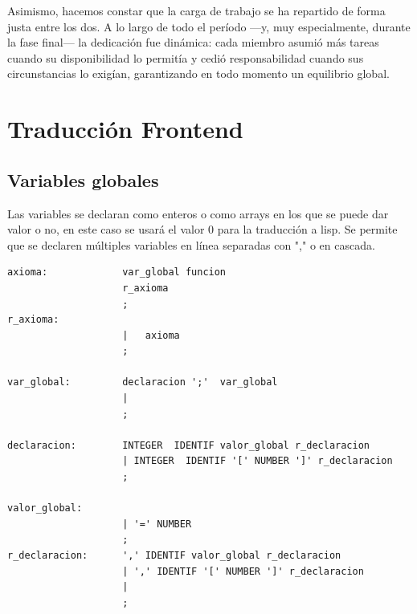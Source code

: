 \documentclass[12pt,a4paper]{article}
\begin{document}
\smallskip
\noindent Asimismo, hacemos constar que la carga de trabajo se ha repartido de forma justa entre los dos. 
A lo largo de todo el período —y, muy especialmente, durante la fase final— la dedicación fue dinámica: 
cada miembro asumió más tareas cuando su disponibilidad lo permitía y cedió responsabilidad cuando sus 
circunstancias lo exigían, garantizando en todo momento un equilibrio global.

\section{Traducción Frontend}
\subsection{Variables globales}
\noindent Las variables se declaran como enteros o como arrays en los que se puede dar valor o no, en este caso se 
usará el valor 0 para la traducción a lisp. Se permite que se declaren múltiples variables en línea 
separadas con "," o en cascada.
\begin{lstlisting}
axioma:             var_global funcion
                    r_axioma
                    ;
r_axioma:
                    |   axioma
                    ;

var_global:         declaracion ';'  var_global
                    |
                    ;

declaracion:        INTEGER  IDENTIF valor_global r_declaracion
                    | INTEGER  IDENTIF '[' NUMBER ']' r_declaracion
                    ;

valor_global:
                    | '=' NUMBER
                    ;
r_declaracion:      ',' IDENTIF valor_global r_declaracion
                    | ',' IDENTIF '[' NUMBER ']' r_declaracion
                    |
                    ;
\end{lstlisting}
\end{document}
